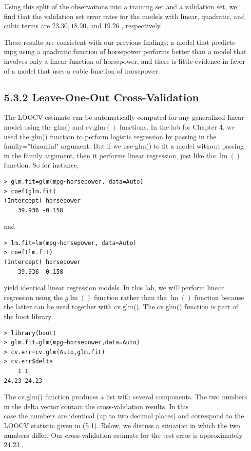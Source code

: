 \documentclass[10pt]{article}
\begin{document}
Using this split of the observations into a training set and a validation set, we find that the validation set error rates for the models with linear, quadratic, and cubic terms are $23.30,18.90$, and 19.26 , respectively.

These results are consistent with our previous findings: a model that predicts mpg using a quadratic function of horsepower performs better than a model that involves only a linear function of horsepower, and there is little evidence in favor of a model that uses a cubic function of horsepower.

\subsection*{5.3.2 Leave-One-Out Cross-Validation}
The LOOCV estimate can be automatically computed for any generalized linear model using the glm() and $\mathrm{cv} . \mathrm{glm}()$ functions. In the lab for Chapter 4, we used the glm() function to perform logistic regression by passing in the family="binomial" argument. But if we use glm() to fit a model without passing in the family argument, then it performs linear regression, just like the $\operatorname{lm}()$ function. So for instance,

\begin{verbatim}
> glm.fit=glm(mpg~horsepower, data=Auto)
> coef(glm.fit)
(Intercept) horsepower
    39.936 -0.158
\end{verbatim}

and

\begin{verbatim}
> lm.fit=lm(mpg~horsepower, data=Auto)
> coef(lm.fit)
(Intercept) horsepower
    39.936 -0.158
\end{verbatim}

yield identical linear regression models. In this lab, we will perform linear regression using the $g \operatorname{lm}()$ function rather than the $\operatorname{lm}()$ function because the latter can be used together with cv.glm(). The cv.glm() function is part of the boot library.

\begin{verbatim}
> library(boot)
> glm.fit=glm(mpg~horsepower,data=Auto)
> cv.err=cv.glm(Auto,glm.fit)
> cv.err$delta
    1 1
24.23 24.23
\end{verbatim}

The cv.glm() function produces a list with several components. The two numbers in the delta vector contain the cross-validation results. In this\\
case the numbers are identical (up to two decimal places) and correspond to the LOOCV statistic given in (5.1). Below, we discuss a situation in which the two numbers differ. Our cross-validation estimate for the test error is approximately 24.23 .
\end{document}
